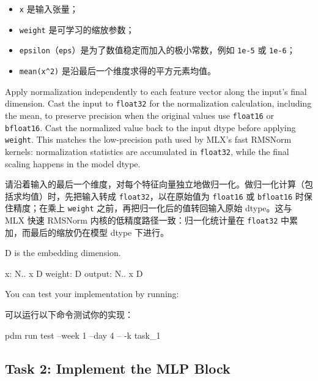 \documentclass[11pt,a4paper]{article}
\newenvironment{zhpar}{%
  \par\smallskip\begingroup\color{zhcolor}\small\ignorespaces%
}{\endgroup\par\smallskip}
\begin{document}
\begin{zhpar}
\begin{itemize}[leftmargin=1.6em,itemsep=0.15em,parsep=0pt]
\item \texttt{x} 是输入张量；
\item \texttt{weight} 是可学习的缩放参数；
\item \texttt{epsilon}（\texttt{eps}）是为了数值稳定而加入的极小常数，例如 \texttt{1e-5} 或 \texttt{1e-6}；
\item \texttt{mean(x\textasciicircum{}2)} 是沿最后一个维度求得的平方元素均值。
\end{itemize}
\end{zhpar}
Apply normalization independently to each feature vector along the input's final dimension. Cast the input to \texttt{float32} for the normalization calculation, including the mean, to preserve precision when the original values use \texttt{float16} or \texttt{bfloat16}. Cast the normalized value back to the input dtype before applying \texttt{weight}. This matches the low-precision path used by MLX's fast RMSNorm kernels: normalization statistics are accumulated in \texttt{float32}, while the final scaling happens in the model dtype.

\begin{zhpar}
请沿着输入的最后一个维度，对每个特征向量独立地做归一化。做归一化计算（包括求均值）时，先把输入转成 \texttt{float32}，以在原始值为 \texttt{float16} 或 \texttt{bfloat16} 时保住精度；在乘上 \texttt{weight} 之前，再把归一化后的值转回输入原始 dtype。这与 MLX 快速 RMSNorm 内核的低精度路径一致：归一化统计量在 \texttt{float32} 中累加，而最后的缩放仍在模型 dtype 下进行。
\end{zhpar}
\begin{codeblock}
D is the embedding dimension.

x: N.. x D
weight: D
output: N.. x D
\end{codeblock}

You can test your implementation by running:

\begin{zhpar}
可以运行以下命令测试你的实现：
\end{zhpar}
\begin{codeblock}
pdm run test --week 1 --day 4 -- -k task_1
\end{codeblock}

\subsection*{Task 2: Implement the MLP Block}
\end{document}
